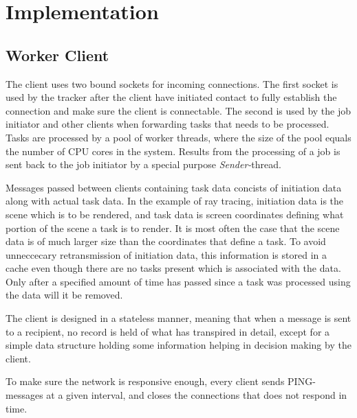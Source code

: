 \chapter{Implementation}

\section{Worker Client}
\label{sec:worker}
The client uses two bound sockets for incoming connections. The first socket is
used by the tracker after the client have initiated contact to fully establish
the connection and make sure the client is connectable. The second is used by
the job initiator and other clients when forwarding tasks that needs to be
processed. Tasks are processed by a pool of worker threads, where the size of
the pool equals the number of CPU cores in the system. Results from the
processing of a job is sent back to the job initiator by a special purpose 
\textit{Sender-}thread.

Messages passed between clients containing task data concists of initiation data
along with actual task data. In the example of ray tracing, initiation data is
the scene which is to be rendered, and task data is screen coordinates defining
what portion of the scene a task is to render. It is most often the case that
the scene data is of much larger size than the coordinates that define a task.
To avoid unneccecary retransmission of initiation data, this information is
stored in a cache even though there are no tasks present which is associated
with the data. Only after a specified amount of time has passed since a task was
processed using the data will it be removed.

The client is designed in a stateless manner, meaning that when a message is
sent to a recipient, no record is held of what has transpired in detail, except
for a simple data structure holding some information helping in decision making
by the client.

To make sure the network is responsive enough, every client sends PING-messages 
at a given interval, and closes the connections that does not respond in time.

